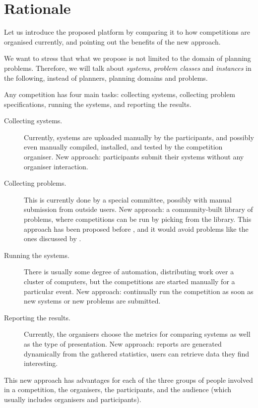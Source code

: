 
\section{Rationale}
\label{sec:rationale}

Let us introduce the proposed platform by comparing it to how competitions are organised currently, and pointing out the benefits of the new approach.

We want to stress that what we propose is not limited to the domain of planning problems. Therefore, we will talk about \emph{systems}, \emph{problem classes} and \emph{instances} in the following, instead of planners, planning domains and problems.

Any competition has four main tasks: collecting systems, collecting problem specifications, running the systems, and reporting the results.

\begin{description}
  \item[Collecting systems.] Currently, systems are uploaded manually by the participants, and possibly even manually compiled, installed, and tested by the competition organiser. New approach: participants submit their systems without any organiser interaction.
  \item[Collecting problems.] This is currently done by a special committee, possibly with manual submission from outside users. New approach: a community-built library of problems, where competitions can be run by picking from the library. This approach has been proposed before \cite{ToughNuts}, and it would avoid problems like the ones discussed by \cite{pg2008002}.
  \item[Running the systems.] There is usually some degree of automation, distributing work over a cluster of computers, but the competitions are started manually for a particular event. New approach: continually run the competition as soon as new systems or new problems are submitted.
  \item[Reporting the results.] Currently, the organisers choose the metrics for comparing systems as well as the type of presentation. New approach: reports are generated dynamically from the gathered statistics, users can retrieve data they find interesting.
\end{description}

This new approach has advantages for each of the three groups of people involved in a competition, the organisers, the participants, and the audience (which usually includes organisers and participants).

